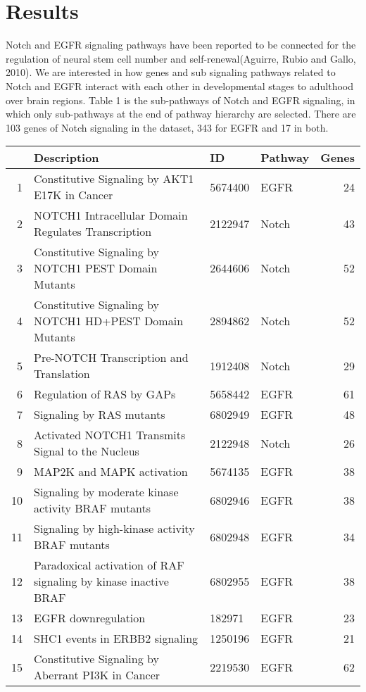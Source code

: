 \documentclass[11pt]{article}
\begin{document}
\section{Results}
Notch and EGFR signaling pathways have been reported to be connected for the regulation of neural
stem cell number and self-renewal(Aguirre, Rubio and Gallo, 2010). We are interested in how genes and sub signaling pathways related to Notch and EGFR interact with each other in developmental stages to adulthood over brain regions. Table 1 is the sub-pathways of Notch and EGFR signaling, in which only sub-pathways at the end of pathway hierarchy are selected. There are 103 genes of Notch signaling in the dataset, 343 for EGFR and 17 in both. 
\begin{table}[ht]
\centering
\begin{tabular}{rlllr}
  \hline
 & Description & ID & Pathway & Genes \\ 
  \hline
1 & Constitutive Signaling by AKT1 E17K in Cancer & 5674400 & EGFR & 24 \\ 
  2 & NOTCH1 Intracellular Domain Regulates Transcription & 2122947 & Notch & 43 \\ 
  3 & Constitutive Signaling by NOTCH1 PEST Domain Mutants & 2644606 & Notch & 52 \\ 
  4 & Constitutive Signaling by NOTCH1 HD+PEST Domain Mutants & 2894862 & Notch & 52 \\ 
  5 & Pre-NOTCH Transcription and Translation & 1912408 & Notch & 29 \\ 
  6 & Regulation of RAS by GAPs & 5658442 & EGFR & 61 \\ 
  7 & Signaling by RAS mutants & 6802949 & EGFR & 48 \\ 
  8 & Activated NOTCH1 Transmits Signal to the Nucleus & 2122948 & Notch & 26 \\ 
  9 & MAP2K and MAPK activation & 5674135 & EGFR & 38 \\ 
  10 & Signaling by moderate kinase activity BRAF mutants & 6802946 & EGFR & 38 \\ 
  11 & Signaling by high-kinase activity BRAF mutants & 6802948 & EGFR & 34 \\ 
  12 & Paradoxical activation of RAF signaling by kinase inactive BRAF & 6802955 & EGFR & 38 \\ 
  13 & EGFR downregulation & 182971 & EGFR & 23 \\ 
  14 & SHC1 events in ERBB2 signaling & 1250196 & EGFR & 21 \\ 
  15 & Constitutive Signaling by Aberrant PI3K in Cancer & 2219530 & EGFR & 62 \\ 

\end{tabular}
\end{table}
\end{document}
